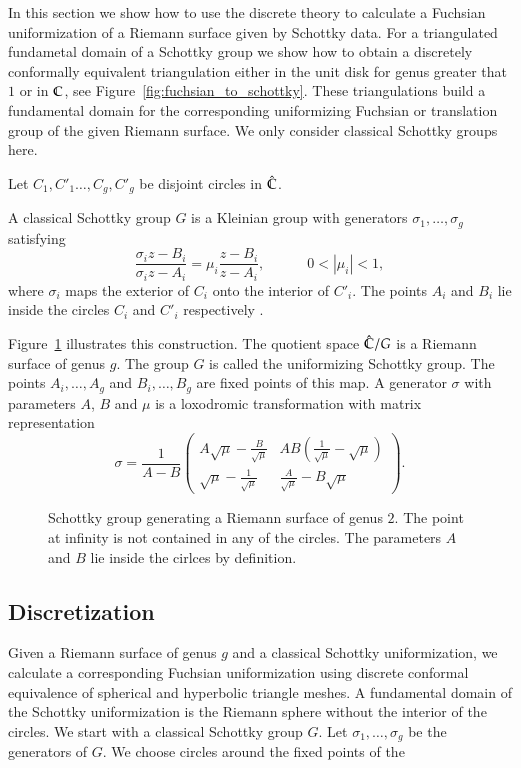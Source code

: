 \documentclass[Thesis.tex]{subfiles}
\begin{document}
In this section we show how to use the discrete theory to calculate a Fuchsian uniformization of a Riemann surface 
given by Schottky data. For a triangulated fundametal domain of a Schottky group we show how to obtain a discretely
conformally equivalent triangulation either in the unit disk for genus greater that $1$ or in $\mathbb C$, see Figure~\ref{fig:fuchsian_to_schottky}. These triangulations build
a fundamental domain for the corresponding uniformizing Fuchsian or translation group of the given Riemann surface. We only consider classical Schottky groups here.

Let $C_1,C'_1\ldots,C_g,C'_g$ be disjoint circles in $\hat{\mathbb C}$. 
\begin{definition}
A classical Schottky group $G$ is a Kleinian group
with generators $\sigma_1,\ldots,\sigma_g$ satisfying
\[\frac{\sigma_i z - B_i}{\sigma_i z - A_i} = \mu_i \frac{z - B_i}{z - A_i}, \quad\quad\quad 0 < \left|\mu_i\right|<1,\]
where $\sigma_i$ maps the exterior of $C_i$ onto the interior of $C'_i$. The points $A_i$ and $B_i$ lie inside the circles $C_i$ and $C'_i$ respectively \cite{bobenko2011riemann}. 
\end{definition}
Figure~\ref{fig:schottky_group} illustrates this construction.
The quotient space $\hat{\mathbb C}/G$ is a Riemann surface of genus $g$. The group $G$ is called the uniformizing
Schottky group. The points $A_i,\ldots,A_g$ and $B_i,\ldots,B_g$ are fixed points of this map.
A generator $\sigma$ with parameters $A$, $B$ and $\mu$ is a loxodromic transformation with matrix representation 
\[
\sigma = \frac{1}{A-B}
\begin{pmatrix}
	A\sqrt{\mu}-\frac{B}{\sqrt\mu} & AB\left(\frac{1}{\sqrt\mu}-\sqrt{\mu}\right) \\
	\sqrt\mu-\frac{1}{\sqrt\mu} & \frac{A}{\sqrt\mu}-B\sqrt\mu
\end{pmatrix}.
\]

\begin{figure}
	\centering
	\scalebox{1.0}{}
	\caption{Schottky group generating a Riemann surface of genus $2$. The point at infinity is not contained in 
any of the circles. The parameters $A$ and $B$ lie inside the cirlces by definition.}
	\label{fig:schottky_group}
\end{figure}



\subsection{Discretization}
Given a Riemann surface of genus $g$ and a classical Schottky uniformization, we calculate a corresponding 
Fuchsian uniformization using discrete conformal equivalence of spherical and hyperbolic triangle meshes.
A fundamental domain of the Schottky uniformization is the Riemann sphere without the interior of the circles.
We start with a classical Schottky group $G$. Let $\sigma_1,\ldots,\sigma_g$ be the generators of $G$. We choose circles around the fixed points of the
\end{document}
